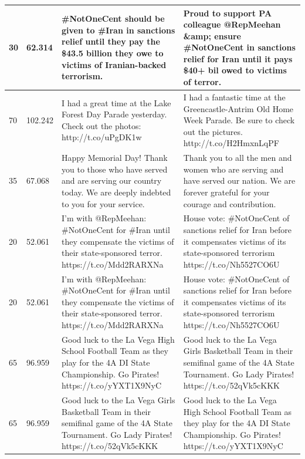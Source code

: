 {\begin{table}[]
\begin{tabular}{|p{}|p{}|p{}|p{}|}
30       & 62.314                      & \#NotOneCent should be given to \#Iran in sanctions relief until they pay the \$43.5 billion they owe to victims of Iranian-backed terrorism.           & Proud to support PA colleague @RepMeehan \&amp; ensure \#NotOneCent in sanctions relief for Iran until it pays \$40+ bil owed to victims of terror. \\ \hline
70       & 102.242                     & I had a great time at the Lake Forest Day Parade yesterday. Check out the photos: http://t.co/uPgDK1w                                                   & I had a fantastic time at the Greencastle-Antrim Old Home Week Parade. Be sure to check out the pictures. http://t.co/H2HmxnLqPF                    \\ \hline
35       & 67.068                      & Happy Memorial Day! Thank you to those who have served and are serving our country today.  We are deeply indebted to you for your service.              & Thank you to all the men and women who are serving and have served our nation. We are forever grateful for your courage and contribution.           \\ \hline
20       & 52.061                      & I'm with @RepMeehan: \#NotOneCent for \#Iran until they compensate the victims of their state-sponsored terror. https://t.co/Mdd2RARXNa                 & House vote: \#NotOneCent of sanctions relief for Iran before it compensates victims of its state-sponsored terrorism https://t.co/Nh5527CO6U        \\ \hline
20       & 52.061                      & I'm with @RepMeehan: \#NotOneCent for \#Iran until they compensate the victims of their state-sponsored terror. https://t.co/Mdd2RARXNa                 & House vote: \#NotOneCent of sanctions relief for Iran before it compensates victims of its state-sponsored terrorism https://t.co/Nh5527CO6U        \\ \hline
65       & 96.959                      & Good luck to the La Vega High School Football Team as they play for the 4A DI State Championship. Go Pirates! https://t.co/yYXT1X9NyC                   & Good luck to the La Vega Girls Basketball Team in their semifinal game of the 4A State Tournament. Go Lady Pirates! https://t.co/52qVk5cKKK         \\ \hline
65       & 96.959                      & Good luck to the La Vega Girls Basketball Team in their semifinal game of the 4A State Tournament. Go Lady Pirates! https://t.co/52qVk5cKKK             & Good luck to the La Vega High School Football Team as they play for the 4A DI State Championship. Go Pirates! https://t.co/yYXT1X9NyC               \\ \hline

\end{tabular}
\end{table}}
